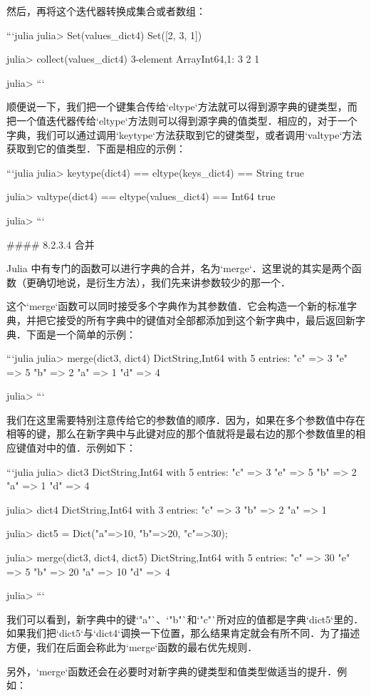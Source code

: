然后，再将这个迭代器转换成集合或者数组：

```julia
julia> Set(values_dict4)
Set([2, 3, 1])

julia> collect(values_dict4)
3-element Array{Int64,1}:
 3
 2
 1

julia>
```

顺便说一下，我们把一个键集合传给`eltype`方法就可以得到源字典的键类型，而把一个值迭代器传给`eltype`方法则可以得到源字典的值类型．相应的，对于一个字典，我们可以通过调用`keytype`方法获取到它的键类型，或者调用`valtype`方法获取到它的值类型．下面是相应的示例：

```julia 
julia> keytype(dict4) == eltype(keys_dict4) == String
true

julia> valtype(dict4) == eltype(values_dict4) == Int64
true

julia> 
```

#### 8.2.3.4 合并

Julia 中有专门的函数可以进行字典的合并，名为`merge`．这里说的其实是两个函数（更确切地说，是衍生方法），我们先来讲参数较少的那一个．

这个`merge`函数可以同时接受多个字典作为其参数值．它会构造一个新的标准字典，并把它接受的所有字典中的键值对全部都添加到这个新字典中，最后返回新字典．下面是一个简单的示例：

```julia
julia> merge(dict3, dict4)
Dict{String,Int64} with 5 entries:
  "c" => 3
  "e" => 5
  "b" => 2
  "a" => 1
  "d" => 4

julia> 
```

我们在这里需要特别注意传给它的参数值的顺序．因为，如果在多个参数值中存在相等的键，那么在新字典中与此键对应的那个值就将是最右边的那个参数值里的相应键值对中的值．示例如下：

```julia
julia> dict3
Dict{String,Int64} with 5 entries:
  "c" => 3
  "e" => 5
  "b" => 2
  "a" => 1
  "d" => 4

julia> dict4
Dict{String,Int64} with 3 entries:
  "c" => 3
  "b" => 2
  "a" => 1

julia> dict5 = Dict("a"=>10, "b"=>20, "c"=>30);

julia> merge(dict3, dict4, dict5)
Dict{String,Int64} with 5 entries:
  "c" => 30
  "e" => 5
  "b" => 20
  "a" => 10
  "d" => 4

julia> 
```

我们可以看到，新字典中的键`"a"`、`"b"`和`"c"`所对应的值都是字典`dict5`里的．如果我们把`dict5`与`dict4`调换一下位置，那么结果肯定就会有所不同．为了描述方便，我们在后面会称此为`merge`函数的最右优先规则．

另外，`merge`函数还会在必要时对新字典的键类型和值类型做适当的提升．例如：

